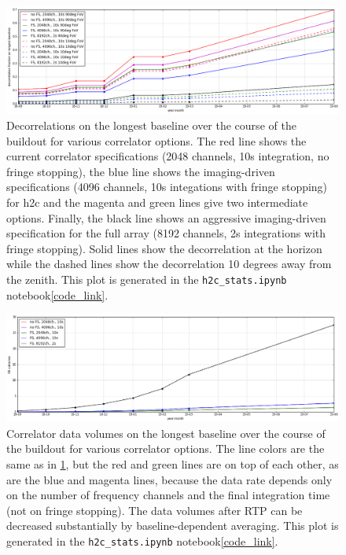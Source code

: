 \documentclass{article}
\begin{document}
\begin{figure}
\includegraphics[width=\textwidth]{spec_calcs/decorrelation.png} 
\caption{Decorrelations on the longest baseline over the course of the buildout for various correlator options. The red line shows the current 
correlator specifications (2048 channels, 10s integration, no fringe stopping), the blue line shows the imaging-driven specifications 
(4096 channels, 10s integations with fringe stopping) for h2c and the magenta and green lines give two intermediate options. 
Finally, the black line shows an aggressive imaging-driven specification for the full array (8192 channels, 2s integrations with fringe stopping). 
Solid lines show the decorrelation at the horizon while the dashed lines show the decorrelation 10 degrees away from the zenith. 
This plot is generated in the  \texttt{h2c\_stats.ipynb} notebook\cref{code_link}.}
\label{Fig:decorr}
\end{figure}

\begin{figure}
\includegraphics[width=\textwidth]{spec_calcs/corr_data_vols.png} 
\caption{Correlator data volumes on the longest baseline over the course of the buildout for various correlator options. 
The line colors are the same as in \ref{Fig:decorr}, but the red and green lines are on top of each other, as are the blue and magenta lines, 
because the data rate depends only on the number of frequency channels and the final integration time (not on fringe stopping). 
The data volumes after RTP can be decreased substantially by baseline-dependent averaging.
This plot is generated in the  \texttt{h2c\_stats.ipynb} notebook\cref{code_link}.}
\label{Fig:corr_vol}
\end{figure}
\end{document}
